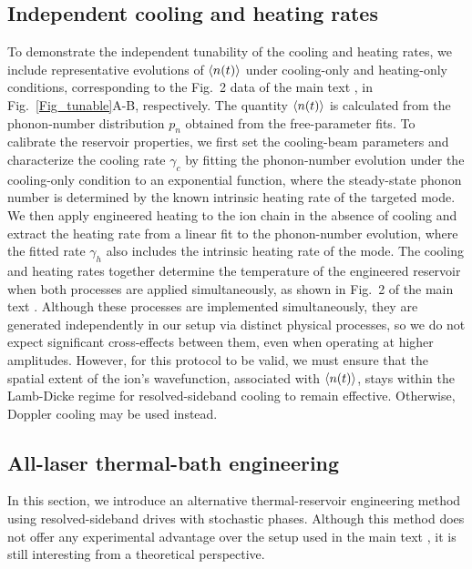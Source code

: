 \documentclass[
reprint,
superscriptaddress,

amsmath,amssymb,
aps,
prl,

floatfix,
]{revtex4-2}
\begin{document}
\subsection*{Independent cooling and heating rates} \label{app_tune}
To demonstrate the independent tunability of the cooling and heating rates, we include representative evolutions of $\braket{n(t)}$ under cooling-only and heating-only conditions, corresponding to the Fig.~2 data of the main text \cite{so2025fT}, in Fig.~\ref{Fig_tunable}A-B, respectively. The quantity $\braket{n(t)}$ is calculated from the phonon-number distribution $p_n$ obtained from the free-parameter fits. To calibrate the reservoir properties, we first set the cooling-beam parameters and characterize the cooling rate $\gamma_c$ by fitting the phonon-number evolution under the cooling-only condition to an exponential function, where the steady-state phonon number is determined by the known intrinsic heating rate of the targeted mode. We then apply engineered heating to the ion chain in the absence of cooling and extract the heating rate from a linear fit to the phonon-number evolution, where the fitted rate $\gamma_h$ also includes the intrinsic heating rate of the mode. The cooling and heating rates together determine the temperature of the engineered reservoir when both processes are applied simultaneously, as shown in Fig.~2 of the main text \cite{so2025fT}. Although these processes are implemented simultaneously, they are generated independently in our setup via distinct physical processes, so we do not expect significant cross-effects between them, even when operating at higher amplitudes. However, for this protocol to be valid, we must ensure that the spatial extent of the ion's wavefunction, associated with $\braket{n(t)}$, stays within the Lamb-Dicke regime for resolved-sideband cooling to remain effective. Otherwise, Doppler cooling may be used instead.

\subsection*{All-laser thermal-bath engineering} \label{app_alllaser}
In this section, we introduce an alternative thermal-reservoir engineering method using resolved-sideband drives with stochastic phases. Although this method does not offer any experimental advantage over the setup used in the main text \cite{so2025fT}, it is still interesting from a theoretical perspective.
\end{document}
